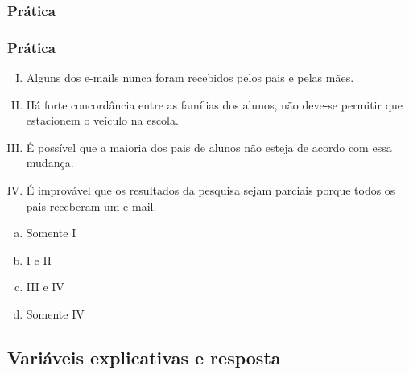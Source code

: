 
\begin{frame}
\frametitle{Prática}
\justifying

\end{frame}

\begin{frame}[shrink]
\frametitle{Prática}
\begin{enumerate}[I.]
\justifying
\item Alguns dos e-mails nunca foram recebidos pelos pais e pelas mães.
\justifying
\item Há forte concordância entre as famílias dos alunos, não deve-se permitir que estacionem o veículo  na escola.
\justifying
\item É possível que a maioria dos pais de alunos não esteja de acordo com essa mudança.
\justifying
\item É improvável que os resultados da pesquisa sejam parciais porque todos os pais receberam um e-mail.
\end{enumerate}


\justifying
\begin{multicols}{2}
\begin{enumerate}[(a)]
\item Somente I
\item I e II
\item III e IV
\item Somente IV
\end{enumerate}
\end{multicols}


\end{frame}


\subsection{Variáveis explicativas e resposta}


